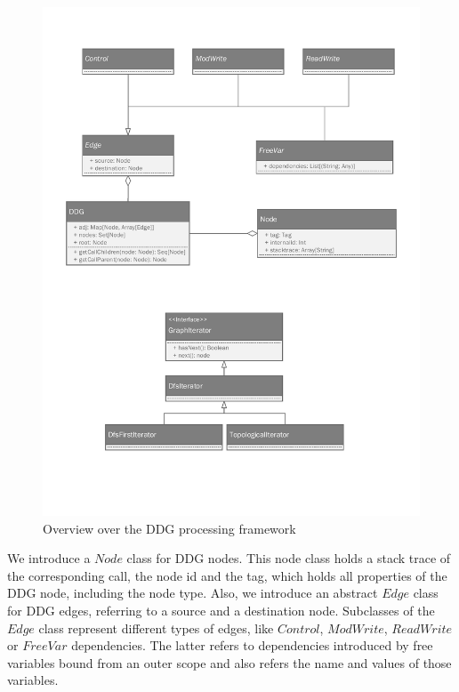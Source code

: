 \begin{figure}
\begin{center}
\includegraphics[scale=0.7]{uml/DDG.pdf}
\end{center}
\caption{Overview over the DDG processing framework}
\label{fig:framework_ddg}
\end{figure}

We introduce a $Node$ class for DDG nodes. This node class holds a stack trace of the corresponding call, the node id and the tag, which holds all properties of the DDG node, including the node type. Also, we introduce an abstract $Edge$ class for DDG edges, referring to a source and a destination node. Subclasses of the $Edge$ class represent different types of edges, like $Control$, $ModWrite$, $ReadWrite$ or $FreeVar$ dependencies. The latter refers to dependencies introduced by free variables bound from an outer scope and also refers the name and values of those variables. 


